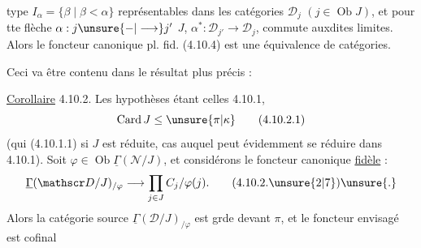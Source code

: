 type $I_{\alpha}=\{\beta\mid\beta<\alpha\}$  représentables dans les catégories $\mathscr D_j$ $(j\in\operatorname{Ob}J)$, et pour tte flèche $\alpha:j\unsure{\mathbin{-}|\longrightarrow}j'$  $J$, $\alpha^*:\mathscr D_{j'}\longrightarrow\mathscr D_j$, commute auxdites limites. Alors le foncteur canonique pl. fid. (4.10.4) est une équivalence de catégories.

Ceci va être contenu dans le résultat  plus précis :

\uline{Corollaire} 4.10.2. Les hypothèses étant celles  4.10.1,  
\[
 \operatorname{Card}J\leq\unsure{\pi|\kappa} \tag*{(4.10.2.1)}
\]
(qui   (4.10.1.1) si $J$ est réduite, cas auquel  peut évidemment se réduire dans 4.10.1). Soit $\varphi\in\operatorname{Ob}\underline{\Gamma}(\mathscr N/J)$, et considérons le foncteur canonique \uline{fidèle} :
\[
 \underline{\Gamma}(\mathscr D/J)_{/\varphi}\longrightarrow
 \prod_{j\in J} C_j/\varphi(j). \tag*{(4.10.2.\unsure{2|7})\unsure{.}}
\]
Alors la catégorie source  $\underline{\Gamma}(\mathscr D/J)_{/\varphi}$ est grde devant $\pi$, et le foncteur envisagé est cofinal
